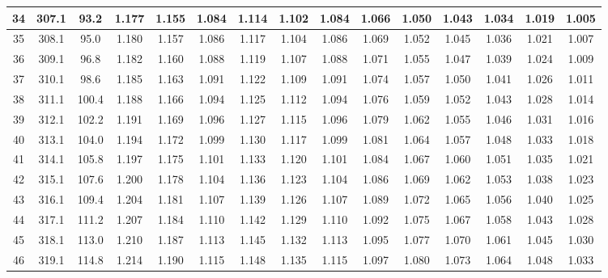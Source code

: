 \documentclass[12pt,a4paper,twoside]{article}
\begin{document}
\begin{center}
\begin{longtable}{ c c c | c c c c c c c c c c c c}
 34 & 307.1 & 93.2 & 1.177 & 1.155 & 1.084 & 1.114 & 1.102 & 1.084 & 1.066 & 1.050 & 1.043 & 1.034 & 1.019 & 1.005 \\ \hline   
 
 35 & 308.1 & 95.0 & 1.180 & 1.157 & 1.086 & 1.117 & 1.104 & 1.086 & 1.069 & 1.052 & 1.045 & 1.036 & 1.021 & 1.007 \\ \hline   
 
 36 & 309.1 & 96.8 & 1.182 & 1.160 & 1.088 & 1.119 & 1.107 & 1.088 & 1.071 & 1.055 & 1.047 & 1.039 & 1.024 & 1.009 \\ \hline   
 
 37 & 310.1 & 98.6 & 1.185 & 1.163 & 1.091 & 1.122 & 1.109 & 1.091 & 1.074 & 1.057 & 1.050 & 1.041 & 1.026 & 1.011 \\ \hline   
 
 38 & 311.1 & 100.4 & 1.188 & 1.166 & 1.094 & 1.125 & 1.112 & 1.094 & 1.076 & 1.059 & 1.052 & 1.043 & 1.028 & 1.014 \\ \hline   
 
 39 & 312.1 & 102.2 & 1.191 & 1.169 & 1.096 & 1.127 & 1.115 & 1.096 & 1.079 & 1.062 & 1.055 & 1.046 & 1.031 & 1.016 \\ \hline   
 
 40 & 313.1 & 104.0 & 1.194 & 1.172 & 1.099 & 1.130 & 1.117 & 1.099 & 1.081 & 1.064 & 1.057 & 1.048 & 1.033 & 1.018 \\ \hline   
 
 41 & 314.1 & 105.8 & 1.197 & 1.175 & 1.101 & 1.133 & 1.120 & 1.101 & 1.084 & 1.067 & 1.060 & 1.051 & 1.035 & 1.021 \\ \hline   
 
 42 & 315.1 & 107.6 & 1.200 & 1.178 & 1.104 & 1.136 & 1.123 & 1.104 & 1.086 & 1.069 & 1.062 & 1.053 & 1.038 & 1.023 \\ \hline   
 
 43 & 316.1 & 109.4 & 1.204 & 1.181 & 1.107 & 1.139 & 1.126 & 1.107 & 1.089 & 1.072 & 1.065 & 1.056 & 1.040 & 1.025 \\ \hline   
 
 44 & 317.1 & 111.2 & 1.207 & 1.184 & 1.110 & 1.142 & 1.129 & 1.110 & 1.092 & 1.075 & 1.067 & 1.058 & 1.043 & 1.028 \\ \hline   
 
 45 & 318.1 & 113.0 & 1.210 & 1.187 & 1.113 & 1.145 & 1.132 & 1.113 & 1.095 & 1.077 & 1.070 & 1.061 & 1.045 & 1.030 \\ \hline   
 
 46 & 319.1 & 114.8 & 1.214 & 1.190 & 1.115 & 1.148 & 1.135 & 1.115 & 1.097 & 1.080 & 1.073 & 1.064 & 1.048 & 1.033 \\ \hline   
 

\end{longtable}
\end{center}
\end{document}
